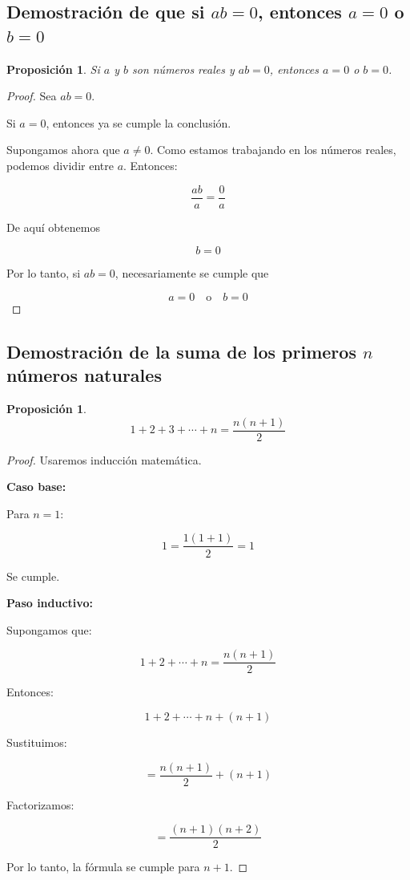 \documentclass[12pt,final]{report}
\theoremstyle{plain}
\newtheorem{proposition}[theorem]{Proposición}
\theoremstyle{definition}
\begin{document}
\newpage

\subsection{Demostración de que si $ab=0$, entonces $a=0$ o $b=0$}

\begin{proposition}
Si $a$ y $b$ son números reales y $ab=0$, entonces $a=0$ o $b=0$.
\end{proposition}

\begin{proof}

Sea $ab=0$.

Si $a=0$, entonces ya se cumple la conclusión.

Supongamos ahora que $a \neq 0$. Como estamos trabajando en los números reales, podemos dividir entre $a$. Entonces:

\[
\frac{ab}{a} = \frac{0}{a}
\]

De aquí obtenemos

\[
b = 0
\]

Por lo tanto, si $ab=0$, necesariamente se cumple que

\[
a=0 \quad \text{o} \quad b=0
\]

\end{proof}

\newpage

\subsection{Demostración de la suma de los primeros $n$ números naturales}

\begin{proposition}
\[
1+2+3+\cdots+n = \frac{n(n+1)}{2}
\]
\end{proposition}

\begin{proof}

Usaremos inducción matemática.

\textbf{Caso base:}

Para $n=1$:

\[
1 = \frac{1(1+1)}{2} = 1
\]

Se cumple.

\textbf{Paso inductivo:}

Supongamos que:

\[
1+2+\cdots+n = \frac{n(n+1)}{2}
\]

Entonces:

\[
1+2+\cdots+n+(n+1)
\]

Sustituimos:

\[
= \frac{n(n+1)}{2} + (n+1)
\]

Factorizamos:

\[
= \frac{(n+1)(n+2)}{2}
\]

Por lo tanto, la fórmula se cumple para $n+1$.

\end{proof}
\end{document}
